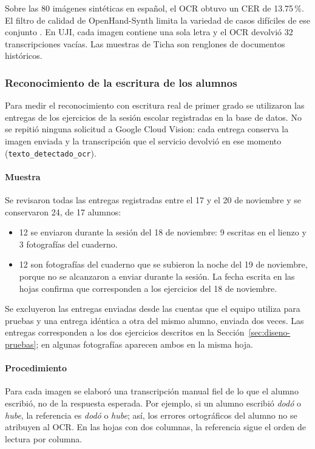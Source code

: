 Sobre las 80 imágenes sintéticas en español, el OCR obtuvo un CER de 13.75\,\%. El filtro de calidad de OpenHand-Synth limita la variedad de casos difíciles de ese conjunto \cite{openhandSynthDataset}. En UJI, cada imagen contiene una sola letra y el OCR devolvió 32 transcripciones vacías. Las muestras de Ticha son renglones de documentos históricos.

\subsubsection{Reconocimiento de la escritura de los alumnos}
\label{sec:resultados-cer-alumnos}

Para medir el reconocimiento con escritura real de primer grado se utilizaron las entregas de los ejercicios de la sesión escolar registradas en la base de datos. No se repitió ninguna solicitud a Google Cloud Vision: cada entrega conserva la imagen enviada y la transcripción que el servicio devolvió en ese momento (\texttt{texto\_detectado\_ocr}).

\paragraph{Muestra}
Se revisaron todas las entregas registradas entre el 17 y el 20 de noviembre y se conservaron 24, de 17 alumnos:
\begin{itemize}
    \item 12 se enviaron durante la sesión del 18 de noviembre: 9 escritas en el lienzo y 3 fotografías del cuaderno.
    \item 12 son fotografías del cuaderno que se subieron la noche del 19 de noviembre, porque no se alcanzaron a enviar durante la sesión. La fecha escrita en las hojas confirma que corresponden a los ejercicios del 18 de noviembre.
\end{itemize}
Se excluyeron las entregas enviadas desde las cuentas que el equipo utiliza para pruebas y una entrega idéntica a otra del mismo alumno, enviada dos veces. Las entregas corresponden a los dos ejercicios descritos en la Sección~\ref{sec:diseno-pruebas}; en algunas fotografías aparecen ambos en la misma hoja.

\paragraph{Procedimiento}
Para cada imagen se elaboró una transcripción manual fiel de lo que el alumno escribió, no de la respuesta esperada. Por ejemplo, si un alumno escribió \textit{dodó} o \textit{hube}, la referencia es \textit{dodó} o \textit{hube}; así, los errores ortográficos del alumno no se atribuyen al OCR. En las hojas con dos columnas, la referencia sigue el orden de lectura por columna.

